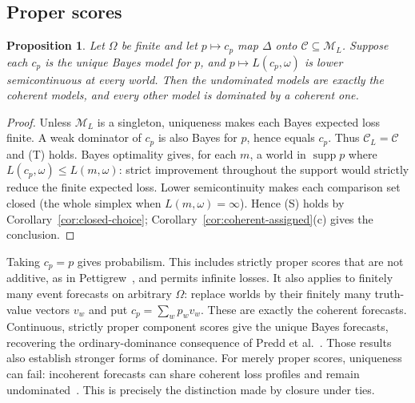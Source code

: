 \documentclass[11pt]{article}
\newtheorem{proposition}[theorem]{Proposition}
\theoremstyle{definition}
\newcommand{\M}{\mathcal M}
\newcommand{\C}{\mathcal C}
\newcommand{\supp}{\operatorname{supp}}
\begin{document}
\subsection{Proper scores}
\begin{proposition}\label{prop:short-proper}
Let $\Omega$ be finite and let $p\mapsto c_p$ map $\Delta$ onto $\C\subseteq\M_L$. Suppose each $c_p$ is the unique Bayes model for $p$, and $p\mapsto L(c_p,\omega)$ is lower semicontinuous at every world. Then the undominated models are exactly the coherent models, and every other model is dominated by a coherent one.
\end{proposition}
\begin{proof}
Unless $\M_L$ is a singleton, uniqueness makes each Bayes expected loss finite. A weak dominator of $c_p$ is also Bayes for $p$, hence equals $c_p$. Thus $\C_L=\C$ and (T) holds. Bayes optimality gives, for each $m$, a world in $\supp p$ where $L(c_p,\omega)\le L(m,\omega)$: strict improvement throughout the support would strictly reduce the finite expected loss. Lower semicontinuity makes each comparison set closed (the whole simplex when $L(m,\omega)=\infty$). Hence (S) holds by Corollary~\ref{cor:closed-choice}; Corollary~\ref{cor:coherent-assigned}(c) gives the conclusion.
\end{proof}
Taking $c_p=p$ gives probabilism. This includes strictly proper scores that are not additive, as in Pettigrew~\cite{Pettigrew2022}, and permits infinite losses. It also applies to finitely many event forecasts on arbitrary $\Omega$: replace worlds by their finitely many truth-value vectors $v_w$ and put $c_p=\sum_wp_wv_w$. These are exactly the coherent forecasts. Continuous, strictly proper component scores give the unique Bayes forecasts, recovering the ordinary-dominance consequence of Predd et al.~\cite{Predd2009}. Those results also establish stronger forms of dominance. For merely proper scores, uniqueness can fail: incoherent forecasts can share coherent loss profiles and remain undominated~\cite{SSK2009}. This is precisely the distinction made by closure under ties.
\end{document}
